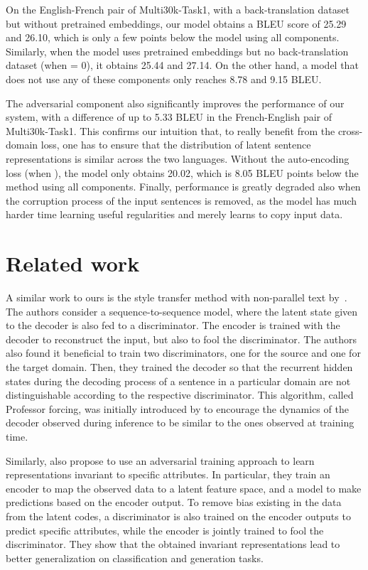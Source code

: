 \documentclass{article} \usepackage{iclr2018_conference,times}
\begin{document}
On the English-French pair of Multi30k-Task1, with a back-translation dataset but without pretrained embeddings, our model obtains a BLEU score of 25.29 and 26.10, which is only a few points below the model using all components. Similarly, when the model uses pretrained embeddings but no back-translation dataset (when  = 0), it obtains 25.44 and 27.14. On the other hand, a model that does not use any of these components only reaches 8.78 and 9.15 BLEU. 

The adversarial component also significantly improves the performance of our system, with a difference of up to 5.33 BLEU in the French-English pair of Multi30k-Task1. This confirms our intuition that, to really benefit from the cross-domain loss, one has to ensure that the distribution of latent sentence representations is similar across the two languages. Without the auto-encoding loss (when ), the model only obtains 20.02, which is 8.05 BLEU points below the method using all components. Finally, performance is greatly degraded also when the corruption process of the input sentences is removed, as the model has much harder time learning useful regularities and merely learns to copy input data.
  \section{Related work}
\label{sec:related_work}

A similar work to ours is the style transfer method with non-parallel text by~\citet{shen2017style}. The authors consider a sequence-to-sequence model, where the latent state given to the decoder is also fed to a discriminator. The encoder is trained with the decoder to reconstruct the input, but also to fool the discriminator. The authors also found it beneficial to train two discriminators, one for the source and one for the target domain. Then, they trained the decoder so that the recurrent hidden states during the decoding process of a sentence in a particular domain are not distinguishable according to the respective discriminator. This algorithm, called Professor forcing, was initially introduced by \citet{lamb2016professor} to encourage the dynamics of the decoder observed during inference to be similar to the ones observed at training time.

Similarly, \citet{xie2017controllable} also propose to use an adversarial training approach to learn representations invariant to specific attributes. In particular, they train an encoder to map the observed data to a latent feature space, and a model to make predictions based on the encoder output. To remove bias existing in the data from the latent codes, a discriminator is also trained on the encoder outputs to predict specific attributes, while the encoder is jointly trained to fool the discriminator. They show that the obtained invariant representations lead to better generalization on classification and generation tasks.
\end{document}
